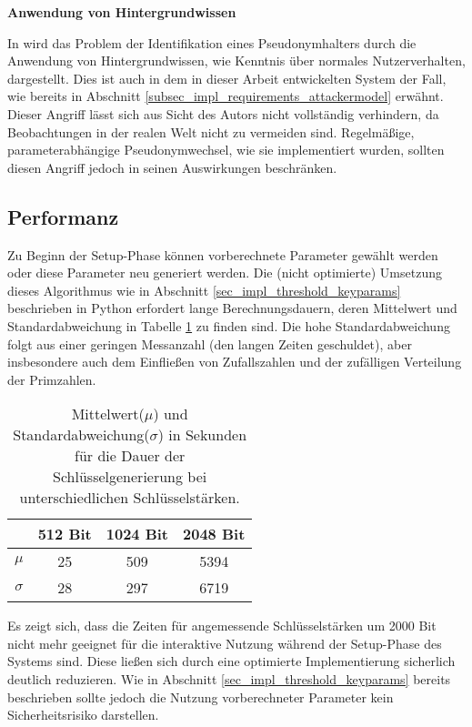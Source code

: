 
\textbf{Anwendung von Hintergrundwissen}

In \cite{lundin1999privacy} wird das Problem der Identifikation eines Pseudonymhalters durch die Anwendung von Hintergrundwissen, wie Kenntnis über normales Nutzerverhalten, dargestellt. Dies ist auch in dem in dieser Arbeit entwickelten System der Fall, wie bereits in Abschnitt \ref{subsec_impl_requirements_attackermodel} erwähnt. Dieser Angriff lässt sich aus Sicht des Autors nicht vollständig verhindern, da Beobachtungen in der realen Welt nicht zu vermeiden sind.
Regelmäßige, parameterabhängige Pseudonymwechsel, wie sie implementiert wurden, sollten diesen Angriff jedoch in seinen Auswirkungen beschränken.



\subsection{Performanz}

Zu Beginn der Setup-Phase können vorberechnete Parameter gewählt werden oder diese Parameter neu generiert werden. Die (nicht optimierte) Umsetzung dieses Algorithmus wie in Abschnitt \ref{sec_impl_threshold_keyparams} beschrieben in Python erfordert lange Berechnungsdauern, deren Mittelwert und Standardabweichung in Tabelle \ref{tab_key_generation} zu finden sind. Die hohe Standardabweichung folgt aus einer geringen Messanzahl (den langen Zeiten geschuldet), aber insbesondere auch dem Einfließen von Zufallszahlen und der zufälligen Verteilung der Primzahlen. 

\begin{table}
  \centering
  \begin{tabular}{|c|c|c|c|}
  \hline 
   & \textbf{512 Bit} & \textbf{1024 Bit} & \textbf{2048 Bit }\\ 
  \hline 
  \(\mu\) & 25  & 509 & 5394 \\ 
  \hline 
  \(\sigma\) & 28  & 297 & 6719 \\ 
  \hline 
  \end{tabular} 
  \caption{Mittelwert(\(\mu\)) und Standardabweichung(\(\sigma\)) in Sekunden für die Dauer der Schlüsselgenerierung bei unterschiedlichen Schlüsselstärken.}
  \label{tab_key_generation}
\end{table}

Es zeigt sich, dass die Zeiten für angemessende Schlüsselstärken um 2000 Bit nicht mehr geeignet für die interaktive Nutzung während der Setup-Phase des Systems sind. Diese ließen sich durch eine optimierte Implementierung sicherlich deutlich reduzieren. Wie in Abschnitt \ref{sec_impl_threshold_keyparams} bereits beschrieben sollte jedoch die Nutzung vorberechneter Parameter kein Sicherheitsrisiko darstellen. 

